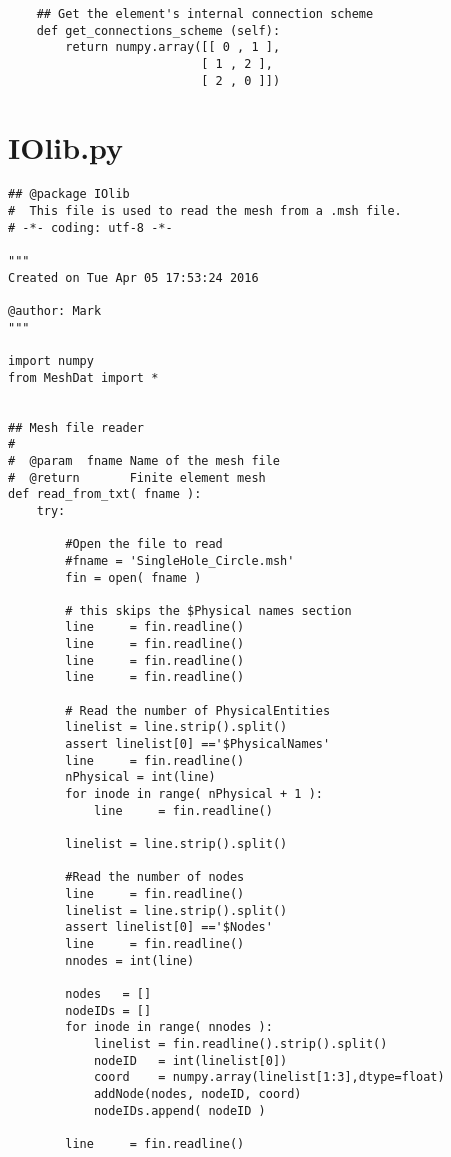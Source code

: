 \begin{appendices}
\begin{verbatim}
    ## Get the element's internal connection scheme
    def get_connections_scheme (self):
        return numpy.array([[ 0 , 1 ],
                           [ 1 , 2 ],
                           [ 2 , 0 ]])

\end{verbatim}

\section{IOlib.py}
\begin{verbatim}
## @package IOlib
#  This file is used to read the mesh from a .msh file.
# -*- coding: utf-8 -*-

"""
Created on Tue Apr 05 17:53:24 2016

@author: Mark
"""

import numpy 
from MeshDat import *


## Mesh file reader
#
#  @param  fname Name of the mesh file
#  @return       Finite element mesh
def read_from_txt( fname ):
    try:

        #Open the file to read
        #fname = 'SingleHole_Circle.msh'
        fin = open( fname )
        
        # this skips the $Physical names section
        line     = fin.readline()
        line     = fin.readline()
        line     = fin.readline()
        line     = fin.readline()
        
        # Read the number of PhysicalEntities
        linelist = line.strip().split()
        assert linelist[0] =='$PhysicalNames'
        line     = fin.readline()
        nPhysical = int(line)
        for inode in range( nPhysical + 1 ):
            line     = fin.readline()
            
        linelist = line.strip().split()
        
        #Read the number of nodes
        line     = fin.readline()
        linelist = line.strip().split()
        assert linelist[0] =='$Nodes'
        line     = fin.readline()
        nnodes = int(line)
        
        nodes   = []
        nodeIDs = []
        for inode in range( nnodes ):
            linelist = fin.readline().strip().split()
            nodeID   = int(linelist[0])
            coord    = numpy.array(linelist[1:3],dtype=float)
            addNode(nodes, nodeID, coord)   
            nodeIDs.append( nodeID )
            
        line     = fin.readline()
        

\end{verbatim}
\end{appendices}
